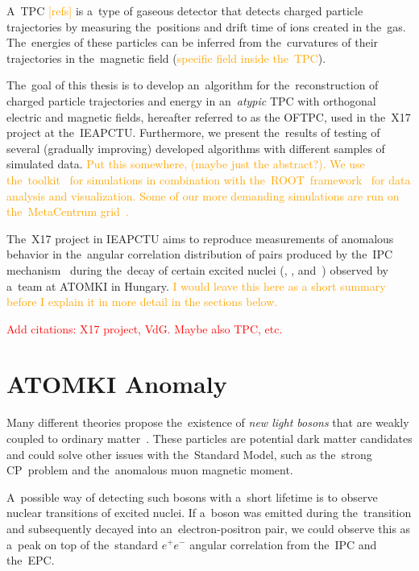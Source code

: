 \setcounter{equation}{0}
\setcounter{figure}{0}
\renewcommand{\theequation}{\thechapter.\arabic{equation}}
\renewcommand{\thefigure}{\thechapter.\arabic{figure}}
	A~\ac{TPC} \textcolor{orange}{[refs]} is a~type of gaseous detector that detects charged particle trajectories by measuring the~positions and drift time of ions created in the~gas. The~energies of these particles can be inferred from the~curvatures of their trajectories in the~magnetic field (\textcolor{orange}{specific field inside the~\ac{TPC}}).
	
	The~goal of this thesis is to develop an~algorithm for the~reconstruction of charged particle trajectories and energy in an~\emph{atypic} \ac{TPC} with orthogonal electric and magnetic fields, hereafter referred to as the \ac{OFTPC}, used in the~X17 project at the~\ac{IEAPCTU}. Furthermore, we present the~results of testing of several (gradually improving) developed algorithms with different samples of simulated data. \textcolor{orange}{Put this somewhere, (maybe just the abstract?). We use the~\garfieldpp toolkit~\cite{Garfield++} for simulations in combination with the~ROOT~framework~\cite{ROOT} for data analysis and visualization. Some of our more demanding simulations are run on the~MetaCentrum grid~\cite{metacentrum}.}
	
	The~X17 project in \ac{IEAPCTU} aims to reproduce measurements of anomalous behavior in the~angular correlation distribution of pairs produced by the~\ac{IPC} mechanism~\cite{IPC} during the~decay of certain excited nuclei (, , and~) observed by a~team at ATOMKI in Hungary. \textcolor{orange}{I would leave this here as a short summary before I explain it in more detail in the sections below.}
	
	\textcolor{red}{Add citations: X17 project, VdG. Maybe also TPC, etc.}
	
	\section{ATOMKI Anomaly}
	\label{sec:ATOMKI}
		Many different theories propose the~existence of \emph{new light bosons} that are weakly coupled to ordinary matter~\cite{dark}. These particles are potential dark matter candidates and could solve other issues with the~Standard Model, such as the~strong CP~problem and the~anomalous muon magnetic moment.
		
		A~possible way of detecting such bosons with a~short lifetime is to observe nuclear transitions of excited nuclei. If a~boson was emitted during the~transition and subsequently decayed into an~electron\nobreakdash-positron pair, we could observe this as a~peak on top of the~standard $e^+e^-$ angular correlation from the~\acf{IPC} and the~\acf{EPC}.
	
